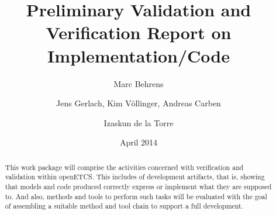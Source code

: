 \documentclass{template/openetcs_report}
\numberwithin{figure}{chapter}
\numberwithin{table}{chapter}
\begin{document}
\frontmatter
{}




\title{Preliminary Validation and Verification Report on Implementation/Code}


\date{April 2014}


\author{Marc Behrens}

 
\author{Jens Gerlach, Kim Völlinger, Andreas Carben}


\author{Izaskun de la Torre}




\begin{abstract}
  This work package will comprise the activities concerned with
  verification and validation within openETCS. This includes \vv of
  development artifacts, that is, showing that models and code
  produced correctly express or implement what they are supposed
  to. And also, methods and tools to perform such tasks will be
  evaluated with the goal of assembling a suitable method and tool
  chain to support a full development.
\end{abstract}

\maketitle
\tableofcontents
\listoffiguresandtables
\clearpage
{}
\cleardoublepage


\mainmatter

\cleardoublepage
\cleardoublepage
\cleardoublepage
\cleardoublepage
\cleardoublepage





\nocite{*}
\end{document}
